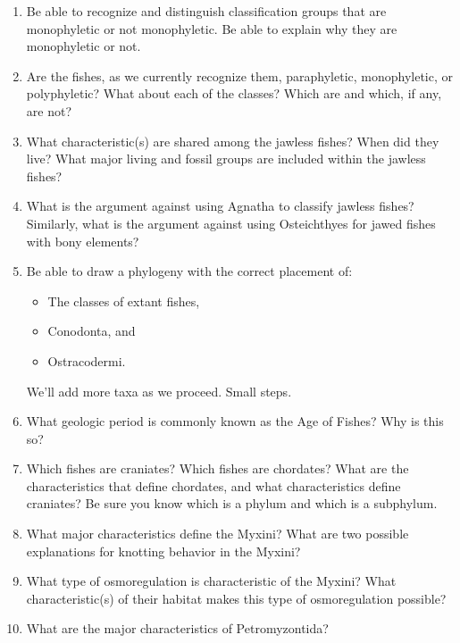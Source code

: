 \documentclass[letterpaper]{tufte-handout}
\begin{document}
\begin{enumerate}
	\item Be able to recognize and distinguish classification groups that are monophyletic or not monophyletic.  Be able to explain why they are monophyletic or not.

	\item Are the fishes, as we currently recognize them, paraphyletic, monophyletic, or polyphyletic?  What about each of the classes? Which are and which, if any, are not?

	\item What characteristic(s) are shared among the jawless fishes?  When did they live? What major living and fossil groups are included within the jawless fishes?

	\item What is the argument against using Agnatha to classify jawless fishes?  Similarly, what is the argument against using Osteichthyes for jawed fishes with bony elements?

	\item Be able to draw a phylogeny with the correct placement of:
	\begin{itemize}
		\item The classes of extant fishes,
		\item Conodonta, and
		\item Ostracodermi.
	\end{itemize}
	We’ll add more taxa as we proceed.  Small steps.
	
	\item What geologic period is commonly known as the Age of Fishes?  Why is this so?

	\item Which fishes are craniates?  Which fishes are chordates?  What are the characteristics that define chordates, and what characteristics define craniates?  Be sure you know which is a phylum and which is a subphylum.
	
		\item What major characteristics define the Myxini?  What are two possible explanations for knotting behavior in the Myxini?

	\item What type of osmoregulation is characteristic of the Myxini?  What characteristic(s) of their habitat makes this type of osmoregulation possible?

	\item What are the major characteristics of Petromyzontida?


\end{enumerate}
\end{document}
